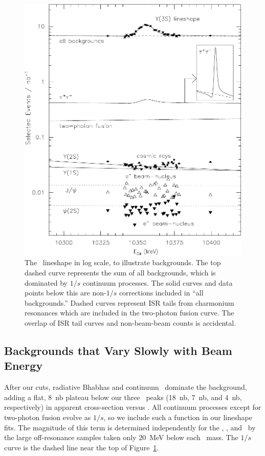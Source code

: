 \documentclass{cornell}
\begin{document}
\begin{figure}[p]
  \begin{center}
    \includegraphics[width=0.9\linewidth]{newplots/awesome}
  \end{center}
  \caption[Illustration of backgrounds in log scale]{\label{awesome}
  The \usss\ lineshape in log scale, to illustrate backgrounds.  The
  top dashed curve represents the sum of all backgrounds, which is
  dominated by $1/s$ continuum processes.  The solid curves and data
  points below this are non-$1/s$ corrections included in ``all
  backgrounds.''  Dashed curves represent ISR tails from charmonium
  resonances which are included in the two-photon fusion curve.  The
  overlap of ISR tail curves and non-beam-beam counts is accidental.}
\end{figure}

\subsection{Backgrounds that Vary Slowly with Beam Energy}
\label{sec:varyslowly}

After our cuts, radiative Bhabhas and continuum \qqbar\ dominate the
background, adding a flat, 8~nb plateau below our three \ups\ peaks
(18~nb, 7~nb, and 4~nb, respectively) in apparent cross-section versus
\ecm.  All continuum processes except for two-photon fusion
evolve as $1/s$, so we include such a function in our lineshape fits.
The magnitude of this term is determined independently for the \us,
\uss, and \usss\ by the large off-resonance samples taken only 20~MeV
below each \ups\ mass.  The $1/s$ curve is the dashed line near the top
of Figure~\ref{awesome}.
\end{document}

